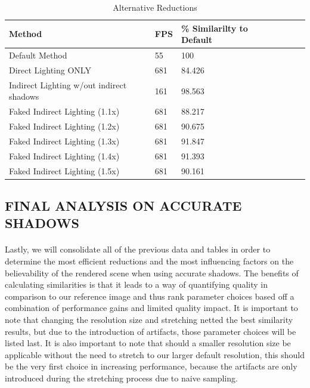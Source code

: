 \begin{table}[h!]
	\caption{Alternative Reductions}
	\begin{center}
	    \begin{tabular}{ | l | l | l | l | l | l |}
	    \hline
	    Method & FPS & \% Similarilty to Default\\ \hline
	    Default Method & 55 & 100\\ \hline
	    Direct Lighting ONLY & 681 & 84.426\\ \hline
	    Indirect Lighting w/out indirect shadows & 161 & 98.563\\ \hline
	    Faked Indirect Lighting (1.1x) & 681 & 88.217\\ \hline
	    Faked Indirect Lighting (1.2x) & 681 & 90.675\\ \hline
	    Faked Indirect Lighting (1.3x) & 681 & 91.847\\ \hline
	    Faked Indirect Lighting (1.4x) & 681 & 91.393\\ \hline
	    Faked Indirect Lighting (1.5x) & 681 & 90.161\\ \hline
	    \end{tabular}
	\end{center}
	\label{table:5.9}
\end{table}

\subsection{FINAL ANALYSIS ON ACCURATE SHADOWS} \label{sec:finalAnalysis}
\paragraph{}
Lastly, we will consolidate all of the previous data and tables in order to determine the most efficient reductions and the most influencing factors on the believability of the rendered scene when using accurate shadows.  The benefits of calculating similarities is that it leads to a way of quantifying quality in comparison to our reference image and thus rank parameter choices based off a combination of performance gains and limited quality impact.  It is important to note that changing the resolution size and stretching netted the best similarity results, but due to the introduction of artifacts, those parameter choices will be listed last.  It is also important to note that should a smaller resolution size be applicable without the need to stretch to our larger default resolution, this should be the very first choice in increasing performance, because the artifacts are only introduced during the stretching process due to naive sampling.

